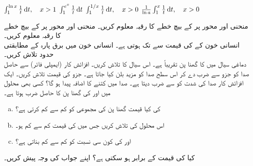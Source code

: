 $\int_1^{\ln x}\frac{1}{t}\dif t,\quad x>1$
$\int_1^{e^x}\frac{1}{t}\dif t$
$\int_1^{1/x}\frac{1}{t}\dif t,\quad x>0$
$\frac{1}{\ln a}\int_1^x\frac{1}{t}\dif t,\quad x>0$

منحنی  اور محور  پر   کے بیچ خطے کا رقبہ معلوم کریں۔
منحنی  اور محور  پر   کے بیچ خطے کا رقبہ معلوم کریں۔
\\
انسانی خون کے  کی قیمت  سے  تک ہوتی ہے۔ انسانی خون میں برق پارہ  کے مطابقتی حدود تلاش کریں۔ 
\\
دماغی سیال میں  کا گھنا پن تقریباً  ہے۔ اس سیال کا  تلاش کریں۔
افزائش کار (ایمپلی فائر) سے حاصل صدا کو جزو  سے ضرب دے کر اس سطح صدا کو  مزید بلن کیا جاتا ہے۔ جزو  کی قیمت تلاش کریں۔
ایک افزائش کار صدا کی شدت کو  سے ضرب دیتا ہے۔ صدا میں کتنے  کا اضافہ پیدا ہو گا؟ 
کسی بھی محلول میں   اور  کی گھنا پن کا حاصل ضرب  ہوتا ہے۔
\begin{enumerate}[a.]
\item
{} کی کیا قیمت گھنا پن کی مجموعی  کو کم سے کم  کرتی ہے؟
\item
اس محلول کی  تلاش کریں  جس میں  کی قیمت کم سے کم ہو۔
\item
{} اور  کی کون سی نسبت  کو کم سے کم بناتی ہے؟
\end{enumerate}
کیا  کی قیمت  کے برابر ہو سکتی ہے؟ اپنے جواب کی وجہ   پیش کریں۔

